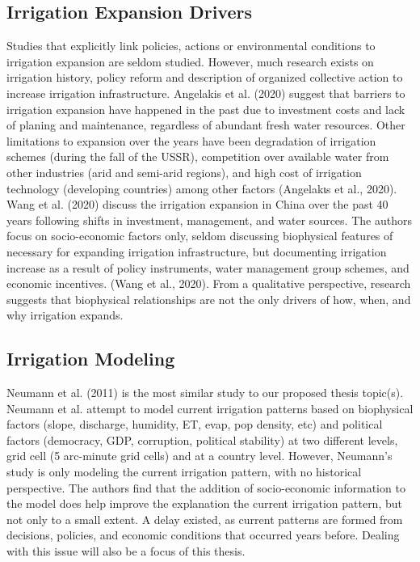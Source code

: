 \documentclass[12pt]{extarticle}
\begin{document}
\subsection{Irrigation Expansion Drivers}
Studies that explicitly link policies, actions or environmental conditions to irrigation expansion are seldom studied. However, much research exists on irrigation history, policy reform and description of organized collective action to increase irrigation infrastructure. Angelakis et al. (2020) suggest that barriers to irrigation expansion have happened in the past due to investment costs and lack of planing and maintenance, regardless of abundant fresh water resources. Other limitations to expansion over the years have been degradation of irrigation schemes (during the fall of the USSR), competition over available water from other industries (arid and semi-arid regions), and high cost of irrigation technology (developing countries) among other factors (Angelakιs et al., 2020). Wang et al. (2020) discuss the irrigation expansion in China over the past 40 years following shifts in investment, management, and water sources. The authors focus on socio-economic factors only, seldom discussing biophysical features of necessary for expanding irrigation infrastructure, but documenting irrigation increase as a result of policy instruments, water management group schemes, and economic incentives. (Wang et al., 2020). From a qualitative perspective, research suggests that biophysical relationships are not the only drivers of how, when, and why irrigation expands. 

\subsection{Irrigation Modeling}
Neumann et al. (2011) is the most similar study to our proposed thesis topic(s). Neumann et al. attempt to model current irrigation patterns based on biophysical factors (slope, discharge, humidity, ET, evap, pop density, etc) and political factors (democracy, GDP, corruption, political stability) at two different levels, grid cell (5 arc-minute grid cells) and at a country level. However, Neumann's study is only modeling the current irrigation pattern, with no historical perspective. The authors find that the addition of socio-economic information to the model does help improve the explanation the current irrigation pattern, but not only to a small extent. A delay existed, as current patterns are formed from decisions, policies, and economic conditions that occurred years before. Dealing with this issue will also be a focus of this thesis. 
\end{document}
